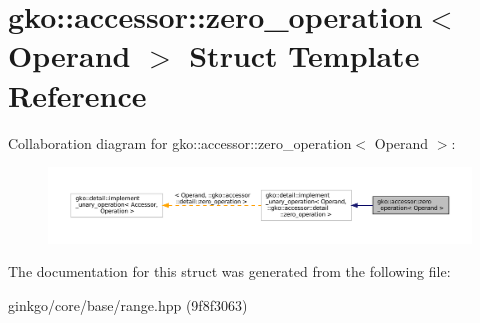 \hypertarget{structgko_1_1accessor_1_1zero__operation}{}\section{gko\+:\+:accessor\+:\+:zero\+\_\+operation$<$ Operand $>$ Struct Template Reference}
\label{structgko_1_1accessor_1_1zero__operation}


Collaboration diagram for gko\+:\+:accessor\+:\+:zero\+\_\+operation$<$ Operand $>$\+:
\nopagebreak
\begin{figure}[H]
\begin{center}
\leavevmode
\includegraphics[width=350pt]{structgko_1_1accessor_1_1zero__operation__coll__graph}
\end{center}
\end{figure}


The documentation for this struct was generated from the following file\+:\begin{DoxyCompactItemize}
\item 
ginkgo/core/base/range.\+hpp (9f8f3063)\end{DoxyCompactItemize}

